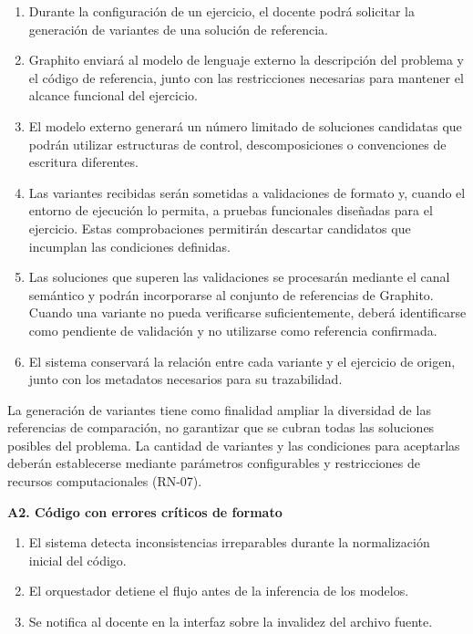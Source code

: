 \begin{enumerate}
	\item Durante la configuración de un ejercicio, el docente podrá solicitar la generación de variantes de una solución de referencia.
	\item Graphito enviará al modelo de lenguaje externo la descripción del problema y el código de referencia, junto con las restricciones necesarias para mantener el alcance funcional del ejercicio.
	\item El modelo externo generará un número limitado de soluciones candidatas que podrán utilizar estructuras de control, descomposiciones o convenciones de escritura diferentes.
	\item Las variantes recibidas serán sometidas a validaciones de formato y, cuando el entorno de ejecución lo permita, a pruebas funcionales diseñadas para el ejercicio. Estas comprobaciones permitirán descartar candidatos que incumplan las condiciones definidas.
	\item Las soluciones que superen las validaciones se procesarán mediante el canal semántico y podrán incorporarse al conjunto de referencias de Graphito. Cuando una variante no pueda verificarse suficientemente, deberá identificarse como pendiente de validación y no utilizarse como referencia confirmada.
	\item El sistema conservará la relación entre cada variante y el ejercicio de origen, junto con los metadatos necesarios para su trazabilidad.
\end{enumerate}

La generación de variantes tiene como finalidad ampliar la diversidad de las referencias de comparación, no garantizar que se cubran todas las soluciones posibles del problema. La cantidad de variantes y las condiciones para aceptarlas deberán establecerse mediante parámetros configurables y restricciones de recursos computacionales (RN-07).

\textbf{A2. Código con errores críticos de formato}

\begin{enumerate}
	\item El sistema detecta inconsistencias irreparables durante la normalización inicial del código.
	\item El orquestador detiene el flujo antes de la inferencia de los modelos.
	\item Se notifica al docente en la interfaz sobre la invalidez del archivo fuente.
\end{enumerate}

